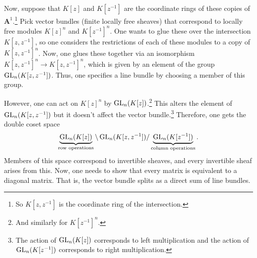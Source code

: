 \documentclass [11 pt, oneside] {article}
\begin{document}
Now, suppose that $K[z]$ and $K[z^{-1}]$ are the coordinate rings of these copies of $\mathbf{A}^1$.\footnote{So $K[z,z^{-1}]$ is the coordinate ring of the intersection.} Pick vector bundles (finite locally free sheaves) that correspond to locally free modules $K[z]^n$ and $K[z^{-1}]^n$. One wants to glue these over the intersection $K[z,z^{-1}]$, so one considers the restrictions of each of these modules to a copy of $K[z,z^{-1}]^n$. Now, one glues these together via an isomorphism $K[z,z^{-1}]^n\longrightarrow K[z,z^{-1}]^n$, which is given by an element of the group $\operatorname{GL}_{n}(K[z,z^{-1}])$. Thus, one specifies a line bundle by choosing a member of this group.

However, one can act on $K[z]^n$ by $\operatorname{GL}_{n}(K[z])$.\footnote{And similarly for $K[z^{-1}]^n$.} This alters the element of $\operatorname{GL}_{n}(K[z,z^{-1}])$ but it doesn't affect the vector bundle.\footnote{The action of $\operatorname{GL}_{n}(K[z])$ corresponds to left multiplication and the action of $\operatorname{GL}_{n}(K[z^{-1}])$ corresponds to right multiplication.} Therefore, one gets the double coset space 
\begin{align*}
	\underbrace{\operatorname{GL}_{n}(K[z])}_{\textrm{row operations}}\backslash  \operatorname{GL}_{n}(K[z,z^{-1}]) / \underbrace{\operatorname{GL}_{n}(K[z^{-1}])}_{\textrm{column operations}}.
\end{align*}
Members of this space correspond to invertible sheaves, and every invertible sheaf arises from this. Now, one needs to show that every matrix is equivalent to a diagonal matrix. That is, the vector bundle splits as a direct sum of line bundles.
\end{document}
